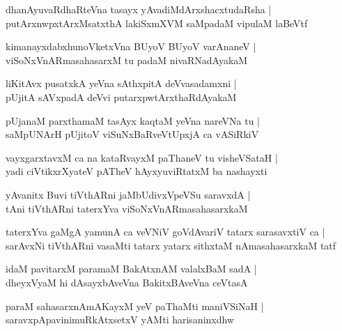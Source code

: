 \documentclass[twoside,12pt,openright]{book}
\newcounter{shloka}[chapter]
\begin{document}
\begin{shloka}%
dhanAyuvaRdhaRteVna tasayx yAvadiMdArxshacxtudaRsha |\\
putArxnwpxtArxMsatxthA lakiSxmXVM saMpadaM vipulaM laBeVtf
\end{shloka}

\begin{shloka}%
kimanayxdabxhunoVketxVna BUyoV BUyoV varAnaneV |\\
viSoNxVnARmasahasarxM tu padaM nivaRNadAyakaM 
\end{shloka}

\begin{shloka}%
liKitAvx pusatxkA yeVna sAthxpitA deVvasadamxni |\\
pUjitA sAVxpadA deVvi putarxpwtArxthaRdAyakaM 
\end{shloka}

\begin{shloka}%
pUjanaM parxthamaM tasAyx kaqtaM yeVna nareVNa tu |\\
saMpUNArH pUjitoV viSuNxBaRveVtUpxjA ca vASiRkiV 
\end{shloka}

\begin{shloka}%
vayxgarxtavxM ca na kataRvayxM paThaneV tu visheVSataH |\\
yadi ciVtikxrXyateV pATheV hAyxyuviRtatxM ba nashayxti
\end{shloka}

\begin{shloka}%
yAvanitx Buvi tiVthARni jaMbUdivxVpeVSu saravxdA |\\
tAni tiVthARni taterxYva viSoNxVnARmasahasarxkaM 
\end{shloka}

\begin{shloka}%
taterxYva gaMgA yamunA ca veVNiV goVdAvariV tatarx sarasavxtiV ca |\\
sarAvxNi tiVthARni vasaMti tatarx yatarx sithxtaM nAmasahasarxkaM tatf 
\end{shloka}

\begin{shloka}%
idaM pavitarxM paramaM BakAtxnAM valalxBaM sadA |\\
dheyxVyaM hi dAsayxbAveVna BakitxBAveVna ceVtasA 
\end{shloka}

\begin{shloka}%
paraM sahasarxnAmAKayxM yeV paThaMti maniVSiNaH |\\
saravxpApavinimuRkAtxsetxV yAMti harisaninxdhw
\end{shloka}
\end{document}
